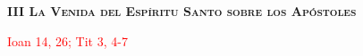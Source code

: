 \begin{center}
    \textbf{\textsc{III La Venida del Espíritu Santo sobre los Apóstoles}}
    
    \textcolor{red}{Ioan 14, 26; Tit 3, 4-7}    
\end{center}


